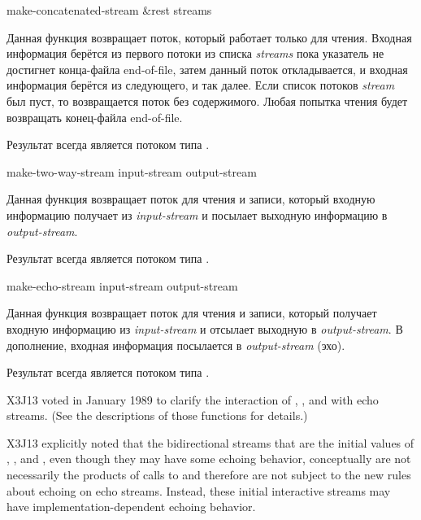 \begin{defun}[Функция]
make-concatenated-stream &rest streams

Данная функция возвращает поток, который работает только для чтения.
Входная информация берётся из первого потоки из списка \emph{streams} пока
указатель не достигнет конца-файла end-of-file, затем данный поток
откладывается, и входная информация берётся из следующего, и так далее. Если
список потоков \emph{stream} был пуст, то возвращается поток без
содержимого. Любая попытка чтения будет возвращать конец-файла end-of-file. 

Результат  всегда является потоком типа
.
\end{defun}

\begin{defun}[Функция]
make-two-way-stream input-stream output-stream

Данная функция возвращает поток для чтения и записи, который входную информацию
получает из \emph{input-stream} и посылает выходную информацию в
\emph{output-stream}.

Результат  всегда является потоком типа
.
\end{defun}

\begin{defun}[Функция]
make-echo-stream input-stream output-stream

Данная функция возвращает поток для чтения и записи, который получает входную
информацию из \emph{input-stream} и отсылает выходную в \emph{output-stream}. В
дополнение, входная информация посылается в \emph{output-stream} (эхо).

Результат  всегда является потоком типа
.

\begin{new}
X3J13 voted in January 1989
to clarify the interaction of
, , and  with echo streams.
(See the descriptions of those functions for details.)

X3J13 explicitly noted that the bidirectional streams that are the initial
values of , , and ,
even though they may have some echoing behavior, conceptually
are not necessarily the products of calls to 
and therefore are not subject to the new rules about echoing on echo
streams.  Instead, these initial interactive streams may have
implementation-dependent echoing behavior.
\end{new}
\end{defun}


